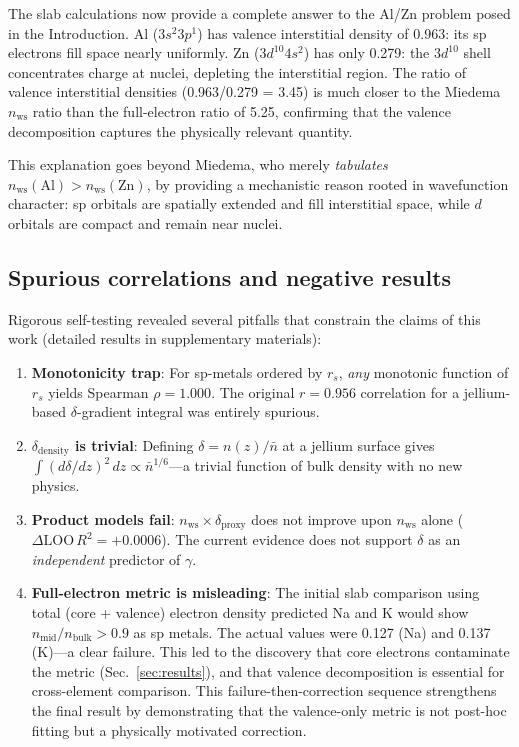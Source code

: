 \documentclass[twocolumn,showpacs,preprintnumbers,amsmath,amssymb,prb]{revtex4-2}
\begin{document}
The slab calculations now provide a complete answer to the
Al/Zn problem posed in the Introduction.
Al ($3s^2 3p^1$) has valence interstitial density of 0.963:
its sp electrons fill space nearly uniformly.
Zn ($3d^{10} 4s^2$) has only 0.279: the $3d^{10}$ shell
concentrates charge at nuclei, depleting the interstitial
region.
The ratio of valence interstitial densities
(0.963/0.279 = 3.45) is much closer to the Miedema
$n_\mathrm{ws}$ ratio than the full-electron ratio
of 5.25, confirming that the valence decomposition
captures the physically relevant quantity.

This explanation goes beyond Miedema, who merely
\emph{tabulates} $n_\mathrm{ws}(\mathrm{Al}) > n_\mathrm{ws}(\mathrm{Zn})$,
by providing a mechanistic reason rooted in wavefunction
character:
sp orbitals are spatially extended and fill interstitial
space, while $d$ orbitals are compact and remain near nuclei.


\subsection{Spurious correlations and negative results}

Rigorous self-testing revealed several pitfalls that
constrain the claims of this work (detailed results in
supplementary materials):

\begin{enumerate}
  \item \textbf{Monotonicity trap}:
    For sp-metals ordered by $r_s$, \emph{any} monotonic
    function of $r_s$ yields Spearman $\rho = 1.000$.
    The original $r = 0.956$ correlation for a jellium-based
    $\delta$-gradient integral was entirely spurious.

  \item \textbf{$\delta_\mathrm{density}$ is trivial}:
    Defining $\delta = n(z)/\bar{n}$ at a jellium surface
    gives $\int(d\delta/dz)^2\,dz \propto \bar{n}^{1/6}$---a
    trivial function of bulk density with no new physics.

  \item \textbf{Product models fail}:
    $n_\mathrm{ws} \times \delta_\mathrm{proxy}$ does not
    improve upon $n_\mathrm{ws}$ alone
    ($\Delta\mathrm{LOO}\,R^2 = +0.0006$).
    The current evidence does not support $\delta$ as an
    \emph{independent} predictor of $\gamma$.

  \item \textbf{Full-electron metric is misleading}:
    The initial slab comparison using total (core + valence)
    electron density predicted Na and K would show
    $n_\mathrm{mid}/n_\mathrm{bulk} > 0.9$ as sp metals.
    The actual values were 0.127 (Na) and 0.137 (K)---a
    clear failure.
    This led to the discovery that core electrons contaminate
    the metric (Sec.~\ref{sec:results}), and that
    valence decomposition is essential for cross-element
    comparison.
    This failure-then-correction sequence strengthens the
    final result by demonstrating that the valence-only
    metric is not post-hoc fitting but a physically motivated
    correction.
\end{enumerate}
\end{document}

